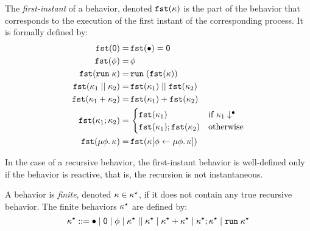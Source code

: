 \documentclass[9pt]{sigplanconf}
\newcommand{\todo}[1]{ {\color{red} #1}}
\newcommand{\sdeq}{::=}
\begin{document}
\begin{definition}
The \emph{first-instant} of a behavior, denoted $\mathtt{fst}(\kappa)$ is the part of the behavior that corresponds to the execution of the first instant of the corresponding process. It is formally defined by:
\begin{align*}
\mathtt{fst}(\textsf{0}) =&\, \mathtt{fst}(\bullet)  = \textsf{0} \\
\mathtt{fst}(\phi) =&\, \phi \\
\mathtt{fst}(\mathtt{run}\; \kappa) =&\, \mathtt{run}\; (\mathtt{fst}(\kappa)) \\ 
\mathtt{fst}(\kappa_1 \mid\mid \kappa_2) =&\, \mathtt{fst}(\kappa_1) \mid\mid \mathtt{fst}(\kappa_2) \\
\mathtt{fst}(\kappa_1 + \kappa_2) =&\, \mathtt{fst}(\kappa_1) + \mathtt{fst}(\kappa_2) \\
\mathtt{fst}(\kappa_1 ; \kappa_2) =&\, 
		\begin{cases}
			\mathtt{fst}(\kappa_1) & \text{if } \kappa_1\downarrow^{\bullet} \\
			\mathtt{fst}(\kappa_1) ; \mathtt{fst}(\kappa_2) &\text{otherwise} 
		\end{cases} \\
\mathtt{fst}(\mu \phi.\, \kappa) =&\, \mathtt{fst}(\kappa[\phi \leftarrow \mu \phi.\, \kappa])
\end{align*}
\end{definition}
In the case of a recursive behavior,  the first-instant behavior is well-defined only if the behavior is reactive, that is, the recursion is not instantaneous.

\begin{definition}
A behavior is \emph{finite}, denoted $\kappa \in \kappa^{\star}$, if it does not contain any true recursive behavior. The finite behaviors $\kappa^{\star}$ are defined by: 
\[
\rkf \sdeq \effplus \mid \effmin \mid \effvar \mid \effpar{\rkf}{\rkf} \mid \effor{\rkf}{\rkf}
\mid \effcon{\rkf}{\rkf}  \mid \effrun{\rkf}
\]
\end{definition}
\end{document}
